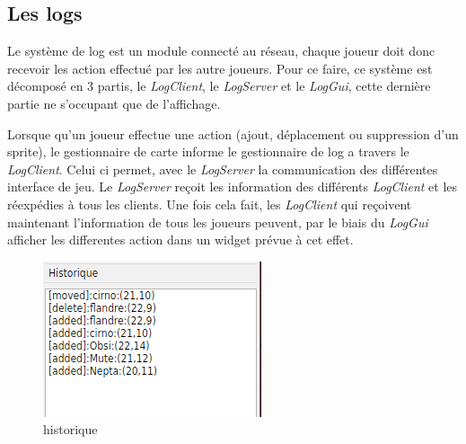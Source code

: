 \subsection{Les logs}

Le système de log est un module  connecté au réseau, chaque joueur doit donc recevoir les action effectué par les autre joueurs.
Pour ce faire, ce système est décomposé en 3 partis,
le \textit{LogClient}, le \textit{LogServer} et le \textit{LogGui},
cette dernière partie ne s'occupant que de l'affichage.

Lorsque qu'un joueur effectue une action (ajout, déplacement ou suppression d'un sprite), le gestionnaire de carte informe le gestionnaire de log a travers le \textit{LogClient}.
Celui ci permet, avec le \textit{LogServer} la communication des différentes interface de jeu.
Le \textit{LogServer} reçoit les information des différents \textit{LogClient} et les réexpédies à tous les clients.
Une fois cela fait, les \textit{LogClient} qui reçoivent maintenant l'information de tous les joueurs peuvent, par le biais du \textit{LogGui} afficher les differentes action dans un widget prévue à cet effet.

\begin{figure}[h!]
    \centering
    \includegraphics[scale=0.7]{img/log.png}
    \caption{historique}
    \label{fig:log}
\end{figure}